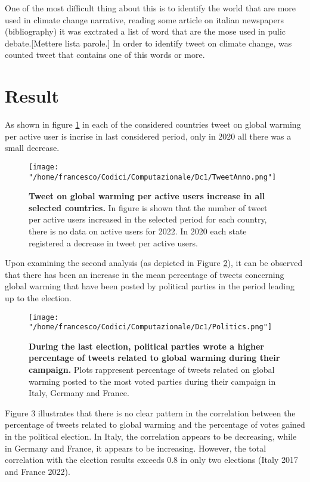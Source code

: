 \documentclass[a4paper,10pt,rmp,superscriptaddress]{revtex4}
\begin{document}
One of the most difficult thing about this is to identify the world that are more used in climate change narrative, reading some article
on italian newspapers (bibliography) it was exctrated a list of word that are the mose used in pulic debate.[Mettere lista parole.]
In order to identify tweet on climate change, was counted tweet that contains one of this words or more.

\section*{Result}
As shown in figure \ref*{fig:1} in each of the considered countries tweet on global warming per active user is incrise in last considered
period, only in 2020 all there was a small decrease.

\begin{figure}[h!]
    \centering
    \texttt{[image: "/home/francesco/Codici/Computazionale/Dc1/TweetAnno.png"]}
    \caption[short]{\textbf{Tweet on global warming per active users increase in all selected countries.} In figure is shown that 
    the number of tweet per active users increased in the selected period for each country, there is no data on active users for 2022. 
    In 2020 each state registered a decrease in tweet per active users.}
    \label{fig:1}
\end{figure}
Upon examining the second analysis (as depicted in Figure \ref*{fig:2}), 
it can be observed that there has been an increase in the mean percentage of tweets concerning global warming that have been posted 
by political parties in the period leading up to the election. 

\begin{figure}[h!]
    \centering
    \texttt{[image: "/home/francesco/Codici/Computazionale/Dc1/Politics.png"]}
    \caption[short]{\textbf{During the last election, political parties wrote a higher percentage of tweets related 
    to global warming during their campaign.} Plots rappresent percentage of tweets related on global warming posted to the most 
    voted parties during their campaign in Italy, Germany and France.}
    \label{fig:2}
\end{figure}
Figure 3 illustrates that there is no clear pattern in the correlation between the percentage of tweets related to global warming 
and the percentage of votes gained in the political election. 
In Italy, the correlation appears to be decreasing, while in Germany and France, it appears to be increasing. 
However, the total correlation with the election results exceeds 0.8 in only two elections (Italy 2017 and France 2022). 
\end{document}
